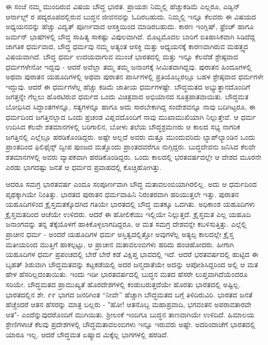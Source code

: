 ಈ ಸಂಜೆ ನಮ್ಮ ಮುಂದಿರುವ ವಿಷಯ ಬೌದ್ಧ ಭಾರತ. ಪ್ರಾಯಶಃ ನಿಮ್ಮಲ್ಲಿ ಹೆಚ್ಚುಕಡಿಮೆ ಎಲ್ಲರೂ, ಎಡ್ವಿನ್ ಆರ್ನಾಲ್ಡ್ ರ ಪದ್ಯರೂಪದಲ್ಲಿರುವ ಬುದ್ಧನ ಜೀವನವನ್ನು ಓದಿರಬಹುದು. ನಿಮ್ಮಲ್ಲಿ ಇನ್ನೂ ಕೆಲವರು ಈ ವಿಷಯದ ಅಧ್ಯಯನವನ್ನು ಹೆಚ್ಚು ವಿದ್ವತ್ ಪೂರ್ಣವಾದ ಆಸಕ್ತಿಯಿಂದ ಮಾಡಿರಬಹುದು. ಕಾರಣ ಇಂಗ್ಲಿಷ್, ಫ್ರೆಂಚ್ ಹಾಗೂ ಜರ್ಮನ್ ಭಾಷೆಗಳಲ್ಲಿ ಬೌದ್ಧ ಸಾಹಿತ್ಯ ಸಾಕಷ್ಟು ವಿಪುಲವಾಗಿದೆ. ಮೊಟ್ಟಮೊದಲ ಬಾರಿಗೆ ಐತಿಹಾಸಿಕವಾಗಿ ಸಿಡಿದೆದ್ದ ಜಾಗತಿಕ ಧರ್ಮವಾದ, ಬೌದ್ಧ ಧರ್ಮವು ನಮ್ಮ ಅತ್ಯಂತ ಆಸಕ್ತಿ ಮತ್ತು ಅಧ್ಯಯನಕ್ಕೆ ಕಾರಣವಾಗಿರುವ ಮಹತ್ತ್ವದ ವಿಷಯವಾಗಿದೆ. ಬೌದ್ಧ ಧರ್ಮ ಉದಯವಾಗುವ ಮುಂಚೆ ಭಾರತದಲ್ಲಿ ಮತ್ತು ಇನ್ನೂ ಕೆಲವೆಡೆ ಶ್ರೇಷ್ಠವಾದ ಧರ್ಮಗಳೇನೋ ಇದ್ದವು - ಆದರೆ ಅವೆಲ್ಲಾ ತಮ್ಮ ತಮ್ಮ ಜನಾಂಗಕ್ಕೆ ಸೀಮಿತವಾಗಿದ್ದವು. ಪುರಾತನ ಹಿಂದೂಗಳಲ್ಲಿ ಅಥವಾ ಪುರಾತನ ಯಹೂದಿಗಳಲ್ಲಿ ಅಥವಾ ಪುರಾತನ ಪಾರ್ಸಿಗಳಲ್ಲಿ ಪ್ರತಿಯೊಬ್ಬರಲ್ಲೂ ಬಹಳ ಶ್ರೇಷ್ಠವಾದ ಧರ್ಮಗಳೇ ಇದ್ದುವು. ಆದರೆ ಈ ಧರ್ಮಗಳೆಲ್ಲ ಹೆಚ್ಚು ಕಡಿಮೆ ಜಾತೀಯ ಧರ್ಮಗಳಷ್ಟೇ. ಬೌದ್ಧಮತದ ಅಭ್ಯುತ್ಥಾನದೊಂದಿಗೆ ಜಗತ್ತನ್ನೇ ಗೆಲ್ಲಲು ಹೊರಟಿರುವ ಧರ್ಮದ ಒಂದು ವಿಚಿತ್ರವಾದ ಅಭಿಯಾನದ ಸೂತ್ರಪಾತವಾಯಿತು. ಬೌದ್ಧಮತ ಬೋಧಿಸಿದ ಸಿದ್ಧಾಂತಗಳನ್ನೂ, ಸತ್ಯಗಳನ್ನೂ ಹಾಗೂ ಅದು ಸಾರಬೇಕಾಗಿದ್ದ ಸಂದೇಶವನ್ನೂ ನಾವು ಬದಿಗಿಟ್ಟರೂ, ಈ ಧರ್ಮದಿಂದ ಜಗತ್ತಿನಲ್ಲಾದ ಒಂದು ಪ್ರಚಂಡ ವಿಪ್ಲವದೊಂದಿಗೆ ನಾವು ಮುಖಾಮುಖಿಯಾಗಿ ನಿಲ್ಲುತ್ತೇವೆ. ಆ ಧರ್ಮ ಉದಿಸಿದ ಕೆಲವೇ ಶತಮಾನಗಳಲ್ಲಿ ಬರಿಗಾಲಿನ, ಬೋಳು ತಲೆಯ ಬೌದ್ಧಶ್ರಮಣರು ಆ ಕಾಲದ ಸಭ್ಯ ನಾಗರಿಕ ಜಗತ್ತಿನಲ್ಲಿ ಎಲ್ಲೆಲ್ಲೂ ಹರಡಿಕೊಂಡಿದ್ದರು. ಅಷ್ಟೇ ಅಲ್ಲದೆ ಅವರು ಮತ್ತೂ ಮುಂದುವರಿದು ಲ್ಯಾಪ್‌ಲ್ಯಾಂಡಿನ ಒಂದು ಪ್ರಾಂತದಿಂದ ಫಿಲಿಫೈನ್ಸ್ ದ್ವೀಪ ಪುಂಜದ ಮತ್ತೊಂದು ಪ್ರಾಂತದವರೆಗೂ ನುಗ್ಗಿದ್ದರು. ಬುದ್ಧದೇವನು ಜನಿಸಿದ ಕೆಲವೇ ಶತಮಾನಗಳಲ್ಲಿ ಅವರು ವ್ಯಾಪಕವಾಗಿ ಹರಡಿಕೊಂಡಿದ್ದರು. ಒಂದು ಕಾಲದಲ್ಲಿ ಭರತವರ್ಷದಲ್ಲೇ ಆ ದೇಶದ ಮೂರನೇ ಎರಡು ಭಾಗದಷ್ಟು ಜನತೆ ಆ ಧರ್ಮದ ಪ್ರವಾಹದಲ್ಲಿ ಕೊಚ್ಚಿಹೋಗಿತ್ತು.

ಆದರೂ ಸಮಗ್ರ ಭಾರತವರ್ಷ ಎಂದೂ ಸಂಪೂರ್ಣವಾಗಿ ಬೌದ್ಧ ಮತಾವಲಂಬಿಯಾಗಿರಲಿಲ್ಲ. ಅದು ಆ ಧರ್ಮದಿಂದ ಪೃಥಕ್ಕಾಗಿಯೇ ನಿಂತಿತ್ತು. ಭಾರತದ ಪುರಾತನ ಧರ್ಮವಾಹಿನಿ ನಿರಂತರವಾಗಿ ಹರಿಯುತ್ತಲೇ ಇತ್ತು. ಪುರಾತನ ಯಹೂದಿಗಳಿಂದ ಕ್ರೈಸ್ತಮತಕ್ಕೊದಗಿದ ಗತಿಯೇ ಭಾರತದಲ್ಲಿ ಬೌದ್ಧ ಮತಕ್ಕೂ ಒದಗಿತು. ಅಧಿಕಾಂಶ ಯಹೂದಿಗಳು ಕ್ರೈಸ್ತಮತದಿಂದ ಆಚೆಯೇ ಉಳಿದರು. ಆದರೆ ಈ ಹೋಲಿಕೆಯು ಇಲ್ಲಿಯೇ ನಿಲ್ಲುತ್ತದೆ. ಕ್ರೈಸ್ತಮತ ಎಲ್ಲ ಯಹೂದಿ ಜನಾಂಗವನ್ನು ತನ್ನ ತೆಕ್ಕೆಯೊಳಗೆ ಹಾಕಿಕೊಳ್ಳಲಾಗದಿದ್ದರೂ, ಆ ಮತ ಸಮಗ್ರ ದೇಶವನ್ನೇ ಕಬಳಿಸುತ್ತಿತ್ತು. ಎಲ್ಲೆಲ್ಲಿ ಪ್ರಾಚೀನ ಧರ್ಮ - ಅಂದರೆ ಯಹೂದಿಗಳ ಧರ್ಮ ಅಸ್ತಿತ್ವದಲ್ಲಿತ್ತೋ ಅವುಗಳೆಲ್ಲ ಅತ್ಯಲ್ಪ ಕಾಲದಲ್ಲೇ ಕ್ರೈಸ್ತ ಮತೀಯರಿಂದ ಮುತ್ತಿಗೆ ಹಾಕಲ್ಪಟ್ಟು, ಆ ಪ್ರಾಚೀನ ಮತಾವಲಂಬಿಗಳು ಹರಿದು ಹಂಚಿಹೋದರು. ಹೀಗಾಗಿ ಯಹೂದಿಗಳ ಧರ್ಮ ಪ್ರಪಂಚದಲ್ಲಿ ಬೇರೆ ಬೇರೆ ಕಡೆ ವಿಕ್ಷಿಪ್ತ ಭಾವದಲ್ಲಿ ಇದೆ. ಆದರೆ ಭರತವರ್ಷದಲ್ಲಿ ಹುಟ್ಟಿದ ಈ ಬೃಹತ್ ಶಿಶುವಾಗಿ ಬೌದ್ಧಮತವನ್ನು ಕಟ್ಟಕಡೆಯಲ್ಲಿ ಅದರ ಜನ್ಮದಾತೆಯೇ ಅದನ್ನು ಆಪೋಶಿಸಿದ್ದರಿಂದ ಅಲ್ಲಿ ಆ ಮತ ಹೇಳ ಹೆಸರಿಲ್ಲದಂತಾಯಿತು. ಇಂದು ಇಡೀ ಭಾರತವರ್ಷದಲ್ಲಿ ಬುದ್ಧನ ಮತದ ಹೆಸರೇ ಲುಪ್ತವಾಗಿದೆಯೆಂದರೂ ಸರಿಯೇ. ಬೌದ್ಧಮತದ ಪ್ರಾಮುಖ್ಯತೆ ಹೊರದೇಶಗಳಲ್ಲಿ ಕಂಡುಬರುತ್ತದೆಯೇ ಹೊರತು ಭಾರತದಲ್ಲಿ ಅಷ್ಟಿಲ್ಲ. ಭಾರತದಲ್ಲಿನ ಶೇ. ೯೯ ಭಾಗದ ಜನರಿಗಿಂತ “ನೀವೇ” ಹೆಚ್ಚಾಗಿ ಬೌದ್ಧಮತದ ಬಗ್ಗೆ ತಿಳಿದಿರುವಿರಿ. ಭಾರತದ ಜನತೆ ಹೆಚ್ಚೆಂದರೆ ಆತನ ಹೆಸರನ್ನು ಮಾತ್ರ ಬಲ್ಲರು - "ಹೋ! ಆತನೊಬ್ಬ ಮಹಾಪ್ರವಾದಿ, ಭಗವಂತನ ಅಪರಾವತಾರವೇ ಆತ"- ಎಂದೆನ್ನುವುದರೊಂದಿಗೆ ಮುಗಿಯಿತು. ಶ‍್ರೀಲಂಕೆ ಇಂದಿಗೂ ಬುದ್ಧನ ತಾಣವಾಗಿಯೇ ಉಳಿದಿದೆ. ಹಿಮಾಲಯ ಶ್ರೇಣಿಗಳಾಚೆ ಕೆಲವು ಪ್ರದೇಶಗಳಲ್ಲಿ ಬೌದ್ಧಮತಾವಲಂಬಿಗಳು ಇನ್ನೂ ಇರುವರು ಅಷ್ಟೇ. ಅದರಿಂದಾಚೆಗೆ ಭಾರತದಲ್ಲಿ ಯಾರೂ ಇಲ್ಲ. ಆದರೆ ಬೌದ್ಧಮತ ಏಷ್ಯಾದ ಮಿಕ್ಕೆಲ್ಲ ಭಾಗಗಳಲ್ಲಿ ಹರಡಿದೆ.

